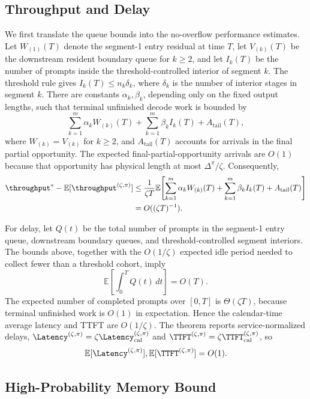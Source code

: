 \subsection{Throughput and Delay}

We first translate the queue bounds into the no-overflow performance estimates. Let \(W_{(1)}(T)\) denote the segment-1 entry residual at time \(T\), let \(V_{(k)}(T)\) be the downstream resident boundary queue for \(k\ge2\), and let \(I_k(T)\) be the number of prompts inside the threshold-controlled interior of segment \(k\). The threshold rule gives \(I_k(T)\le n_k\delta_k\), where \(\delta_k\) is the number of interior stages in segment \(k\). There are constants \(\alpha_k,\beta_k\), depending only on the fixed output lengths, such that terminal unfinished decode work is bounded by
\[
    \sum_{k=1}^m \alpha_k W_{(k)}(T)
    +
    \sum_{k=1}^m \beta_k I_k(T)
    +
    A_{\mathrm{tail}}(T),
\]
where \(W_{(k)}=V_{(k)}\) for \(k\ge2\), and \(A_{\mathrm{tail}}(T)\) accounts for arrivals in the final partial opportunity. The expected final-partial-opportunity arrivals are \(O(1)\) because that opportunity has physical length at most \(\Delta^\pi/\zeta\). Consequently,
\[
\begin{aligned}
    \throughput^*-\mathbb{E}[\throughput^{(\zeta,\pi)}]
    &\le
    \frac{1}{\zeta T}
    \mathbb{E}\!\left[
    \sum_{k=1}^m \alpha_k W_{(k)}(T)
    +
    \sum_{k=1}^m \beta_k I_k(T)
    +
    A_{\mathrm{tail}}(T)
    \right]  \\
    &= O((\zeta T)^{-1}).
\end{aligned}
\]

For delay, let \(Q(t)\) be the total number of prompts in the segment-1 entry queue, downstream boundary queues, and threshold-controlled segment interiors. The bounds above, together with the \(O(1/\zeta)\) expected idle period needed to collect fewer than a threshold cohort, imply
\[
    \mathbb{E}\!\left[\int_0^T Q(t)\,dt\right]=O(T).
\]
The expected number of completed prompts over \([0,T]\) is \(\Theta(\zeta T)\), because terminal unfinished work is \(O(1)\) in expectation. Hence the calendar-time average latency and TTFT are \(O(1/\zeta)\). The theorem reports service-normalized delays, \(\Latency^{(\zeta,\pi)}=\zeta\Latency_{\rm cal}^{(\zeta,\pi)}\) and \(\TTFT^{(\zeta,\pi)}=\zeta\TTFT_{\rm cal}^{(\zeta,\pi)}\), so
\[
    \mathbb{E}[\Latency^{(\zeta,\pi)}],
    \mathbb{E}[\TTFT^{(\zeta,\pi)}]
    =
    O(1).
\]

\subsection{High-Probability Memory Bound}

